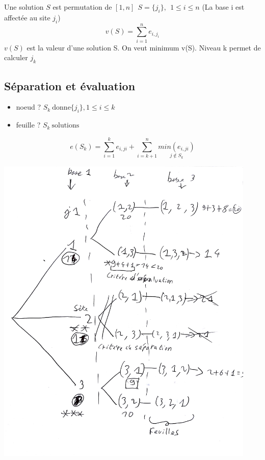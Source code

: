 \documentclass[11pt,a4paper]{article}
\begin{document}
	Une solution $S$ est permutation de $[1,n]\ \ S = \{j_i\},\ \ 1 \leqslant i \leqslant n$
	(La base i est affectée au site $j_i$)
	$$v(S) = \sum_{i=1}^{n} e_{i,j_{i}}$$
	$v(S)$ est la valeur d'une solution S. On veut minimum v(S). Niveau k permet de calculer $j_k$
	
	\subsection{Séparation et évaluation}
	\begin{itemize}
		\item noeud ? $S_k\ \text{donne} \{j_i\}, 1 \leqslant i \leqslant k$
		\item feuille ? $S_k\ \text{solutions}$
	\end{itemize}
	$$e(S_k) = \sum_{i=1}^{k} e_{i,j{i}} + \sum_{i=k+1}^{n} \underset{j \notin S_k}{min(e_{i,j{i}})}$$
	
	\includegraphics[width=0.93\textwidth]{arbre.jpg}
	
\end{document}
